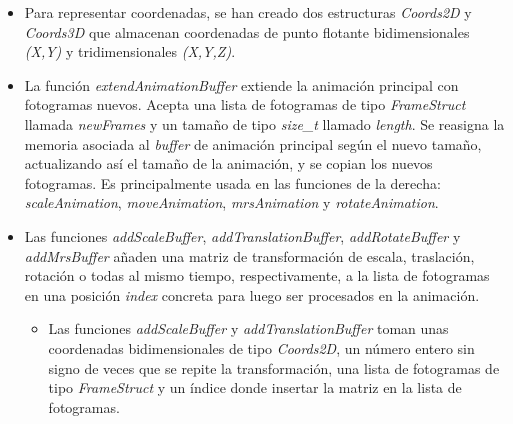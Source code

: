 \begin{itemize}
\begin{enumerate}
            \item \textit{modelMatrixLoc}. Un número entero \textit{GLint} que representa la localización de la variable de tipo \textit{uniform} que almacena la matriz de transformación en el \textit{shader}.

            \item \textit{MS\_FPS}. Un número entero sin signo que representa los fotogramas por segundo transformados en milisegundos.

            \item \textit{frameFunction}. Un puntero hacia una función que acepta un argumento entero sin devolver un valor. Es el mecanismo principal del fotograma que se ejecuta por cada uno y se encarga de realizar la transición entre los estados de la animación, gestionar las matrices de transformación y la comunicación entre el programa y el \textit{shader}.
            
        \end{enumerate}
        
    \item Para representar coordenadas, se han creado dos estructuras \textit{Coords2D} y \textit{Coords3D} que almacenan coordenadas de punto flotante bidimensionales \textit{(X,Y)} y tridimensionales \textit{(X,Y,Z)}.

    \item La función \textit{extendAnimationBuffer} extiende la animación principal con fotogramas nuevos. Acepta una lista de fotogramas de tipo \textit{FrameStruct} llamada \textit{newFrames} y un tamaño de tipo \textit{size\_t} llamado \textit{length}. Se reasigna la memoria asociada al \textit{buffer} de animación principal según el nuevo tamaño, actualizando así el tamaño de la animación, y se copian los nuevos fotogramas. Es principalmente usada en las funciones de la derecha: \textit{scaleAnimation}, \textit{moveAnimation}, \textit{mrsAnimation} y \textit{rotateAnimation}.

    \item Las funciones \textit{addScaleBuffer}, \textit{addTranslationBuffer}, \textit{addRotateBuffer} y \textit{addMrsBuffer} añaden una matriz de transformación de escala, traslación, rotación o todas al mismo tiempo, respectivamente, a la lista de fotogramas en una posición \textit{index} concreta para luego ser procesados en la animación.
        \begin{itemize}
            \item Las funciones \textit{addScaleBuffer} y \textit{addTranslationBuffer} toman unas coordenadas bidimensionales de tipo \textit{Coords2D}, un número entero sin signo de veces que se repite la transformación, una lista de fotogramas de tipo \textit{FrameStruct} y un índice donde insertar la matriz en la lista de fotogramas.
        \end{itemize}


\end{itemize}
